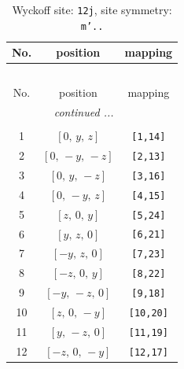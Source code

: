 \documentclass[fleqn,8pt]{jsarticle}
\begin{document}
\begin{longtable}{ccc}
\caption{Wyckoff site: {\tt 12j}, site symmetry: {\tt m'..}}
 \\
 \hline \hline
No. & position & mapping \\ \hline \endfirsthead

\multicolumn{2}{l}{\tablename\ \thetable{}} \\
 \hline \hline
No. & position & mapping \\ \hline \endhead

 \hline \hline
\multicolumn{2}{r}{\footnotesize\it continued ...} \\ \endfoot

 \hline \hline
\multicolumn{2}{r}{} \\ \endlastfoot

1 & $\left[ 0,\, y,\, z \right]$ & {\tt [1,14]} \\ \hline
2 & $\left[ 0,\, - y,\, - z \right]$ & {\tt [2,13]} \\ \hline
3 & $\left[ 0,\, y,\, - z \right]$ & {\tt [3,16]} \\ \hline
4 & $\left[ 0,\, - y,\, z \right]$ & {\tt [4,15]} \\ \hline
5 & $\left[ z,\, 0,\, y \right]$ & {\tt [5,24]} \\ \hline
6 & $\left[ y,\, z,\, 0 \right]$ & {\tt [6,21]} \\ \hline
7 & $\left[ - y,\, z,\, 0 \right]$ & {\tt [7,23]} \\ \hline
8 & $\left[ - z,\, 0,\, y \right]$ & {\tt [8,22]} \\ \hline
9 & $\left[ - y,\, - z,\, 0 \right]$ & {\tt [9,18]} \\ \hline
10 & $\left[ z,\, 0,\, - y \right]$ & {\tt [10,20]} \\ \hline
11 & $\left[ y,\, - z,\, 0 \right]$ & {\tt [11,19]} \\ \hline
12 & $\left[ - z,\, 0,\, - y \right]$ & {\tt [12,17]} \\
\end{longtable}
\renewcommand{\arraystretch}{1.2}
\end{document}
